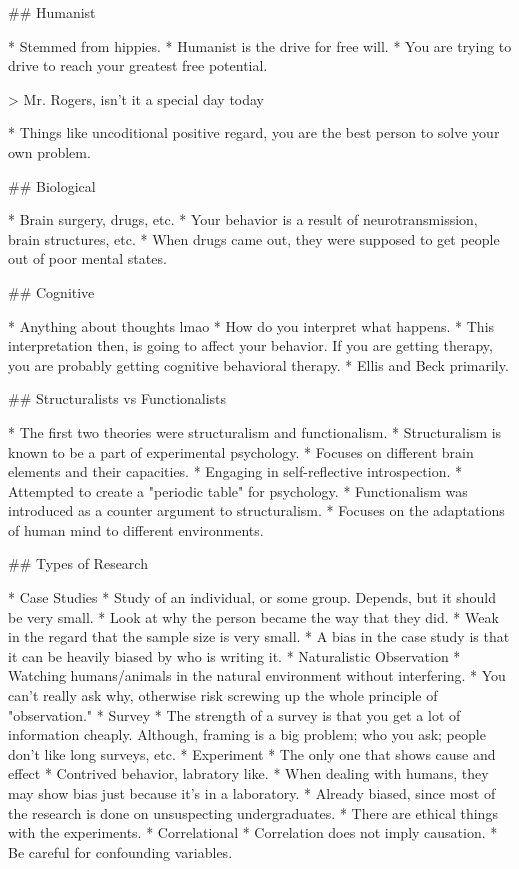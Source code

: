 \documentclass{article}
\begin{document}
\begin{markdown}
## Humanist

* Stemmed from hippies.
* Humanist is the drive for free will.
* You are trying to drive to reach your greatest free potential.

> Mr. Rogers, isn't it a special day today

* Things like uncoditional positive regard, you are the best person to solve your own problem.

## Biological

* Brain surgery, drugs, etc.
* Your behavior is a result of neurotransmission, brain structures, etc.
* When drugs came out, they were supposed to get people out of poor mental states.

## Cognitive

* Anything about thoughts lmao
* How do you interpret what happens.
* This interpretation then, is going to affect your behavior. If you are getting therapy, you are probably getting cognitive behavioral therapy.
* Ellis and Beck primarily.

## Structuralists vs Functionalists

* The first two theories were structuralism and functionalism.
* Structuralism is known to be a part of experimental psychology.
	* Focuses on different brain elements and their capacities.
	* Engaging in self-reflective introspection.
	* Attempted to create a "periodic table" for psychology.
* Functionalism was introduced as a counter argument to structuralism.
	* Focuses on the adaptations of human mind to different environments.

## Types of Research

* Case Studies
	* Study of an individual, or some group. Depends, but it should be very small.
	* Look at why the person became the way that they did.
	* Weak in the regard that the sample size is very small.
	* A bias in the case study is that it can be heavily biased by who is writing it.
* Naturalistic Observation
	* Watching humans/animals in the natural environment without interfering.
	* You can't really ask why, otherwise risk screwing up the whole principle of "observation."
* Survey
	* The strength of a survey is that you get a lot of information cheaply. Although, framing is a big problem; who you ask; people don't like long surveys, etc.
* Experiment
	* The only one that shows cause and effect
	* Contrived behavior, labratory like.
	* When dealing with humans, they may show bias just because it's in a laboratory.
	* Already biased, since most of the research is done on unsuspecting undergraduates.
	* There are ethical things with the experiments.
* Correlational
	* Correlation does not imply causation.
	* Be careful for confounding variables.


\end{markdown}
\end{document}
